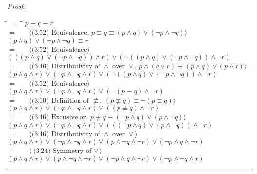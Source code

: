 \documentclass[12pt, fleqn, leqno]{article}
\newcommand{\lgap}{2pt}                             %
\newcommand{\mymathindent}{24pt}                    %
\newcommand{\nequiv}{\ensuremath{\not\equiv}}       %
\newcommand{\myqed}{\rule[-.23ex]{1.2ex}{2.0ex}}
\newcommand{\myqedtab}{\hspace{384pt}}              %
\newcommand{\Gll} {\langle}                         %
\newcommand{\Ggg} {\rangle}                         %
\newcommand{\Hint}[1]     {\ \ \ $\Gll              \mbox{#1} \Ggg$ }   %
\begin{document}
\textit{Proof}:
\begin{tabbing}
\hspace{\mymathindent} \= $= \;$ \= \myqedtab \= \kill
	\> \>  $p \equiv q \equiv r$\\
	\> $=$  \>  \Hint{(3.52) Equivalence, $p \equiv q \equiv (p \land q) \lor (\lnot p \land \lnot q)$}\\[\lgap]
	\> \>   $(p \land q) \lor (\lnot p \land \lnot q)\equiv r$\\
	\> $=$  \>  \Hint{(3.52) Equivalence}\\[\lgap]
	\> \>   $(((p \land q) \lor (\lnot p \land \lnot q)) \land r) \lor (\lnot ((p \land q) \lor (\lnot p \land \lnot q)) \land \lnot r)$\\
	\> $=$  \>  \Hint{(3.46) Distributivity of $\land$ over $\lor$, $p \land (q \lor r) \equiv (p \land q) \lor (p \land r)$}\\[\lgap]
	\> \>   $(p \land q \land r) \lor (\lnot p \land \lnot q \land r) \lor (\lnot ((p \land q) \lor (\lnot p \land \lnot q)) \land \lnot r)$\\
	\> $=$  \>  \Hint{(3.52) Equivalence}\\[\lgap]
	\> \>  $(p \land q \land r) \lor (\lnot p \land \lnot q \land r) \lor (\lnot (p \equiv q) \land \lnot r)$\\
	\> $=$  \>  \Hint{(3.10) Definition of $\nequiv$, $(p \nequiv q) \equiv \lnot (p \equiv q)$}\\[\lgap]
	\> \>   $(p \land q \land r) \lor (\lnot p \land \lnot q \land r) \lor ((p \nequiv q) \land \lnot r)$\\
	\> $=$  \>  \Hint{(3.46) Excusive or, $p \nequiv q \equiv (\lnot p \land q) \lor (p \land \lnot q)$}\\[\lgap]
	\> \>   $(p \land q \land r) \lor (\lnot p \land \lnot q \land r) \lor (((\lnot p \land q) \lor (p \land \lnot q)) \land \lnot r)$\\
	\> $=$  \>  \Hint{(3.46) Distributivity of $\land$ over $\lor$}\\[\lgap]
	\> \>   $(p \land q \land r) \lor (\lnot p \land \lnot q \land r) \lor (p \land \lnot q \land \lnot r) \lor (\lnot p \land q \land \lnot r)$\\
	\> $=$  \>  \Hint{(3.24) Symmetry of $\lor$}\\[\lgap]
	\> \>   $(p \land q \land r) \lor (p \land \lnot q \land \lnot r) \lor (\lnot p \land q \land \lnot r) \lor (\lnot p \land \lnot q \land r) $ \quad \myqed\\
\end{tabbing}
\end{document}
